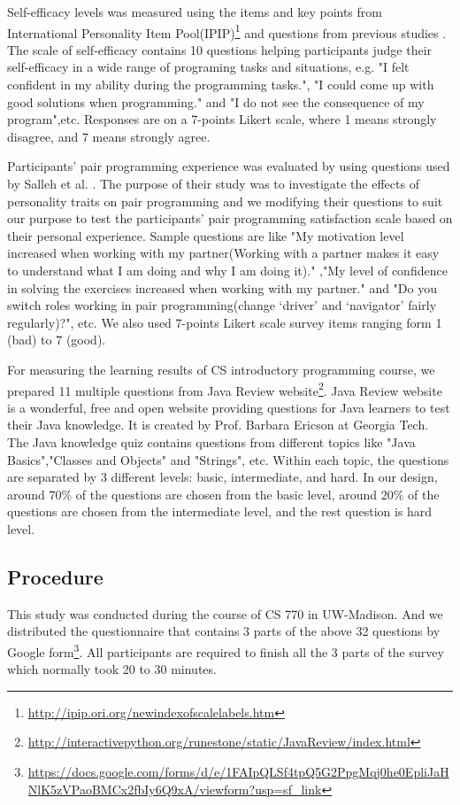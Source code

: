 \documentclass{sigchi}
\begin{document}
Self-efficacy levels was measured using the items and key points from International Personality Item Pool(IPIP)\footnote{\url{http://ipip.ori.org/newindexofscalelabels.htm}} and questions from
previous studies \cite{ramalingam1998development,wilson2001contributing}. The scale of self-efficacy contains 10 questions helping participants judge their self-efficacy in a wide range of programing tasks and situations, e.g. "I felt confident in my ability during the programming tasks.", "I could come up with good solutions when programming." and "I do not see the consequence of my program",etc. Responses are on a 7-points Likert scale, where 1 means strongly disagree, and 7 means strongly agree.

Participants' pair programming experience was evaluated by using questions used by Salleh et al. \cite{salleh2014investigating}. The purpose of their study was to investigate the effects of personality traits on pair programming and we modifying their questions to suit our purpose to test the participants' pair programming satisfaction scale based on their personal experience. Sample questions are like "My motivation level increased when working with my partner(Working with a partner makes it easy to understand what I am doing and why I am doing it)." ,"My level of confidence in solving the exercises increased when working with my partner." and "Do you switch roles working in pair programming(change ‘driver’ and ‘navigator’ fairly regularly)?", etc. We also used 7-points Likert scale survey items ranging form 1 (bad) to 7 (good).

For measuring the learning results of CS introductory programming course, we prepared 11 multiple questions from Java Review website\footnote{\url{http://interactivepython.org/runestone/static/JavaReview/index.html}}. Java Review website is a wonderful, free and open website providing questions for Java learners to test their Java knowledge. It is created by Prof. Barbara Ericson at Georgia Tech.  The Java knowledge quiz contains questions from different topics like "Java Basics","Classes and Objects" and "Strings", etc. Within each topic, the questions are separated by 3 different levels: basic, intermediate, and hard. In our design, around 70\% of the questions are chosen from the basic level, around 20\% of the questions are chosen from the intermediate level, and the rest question is hard level. 


\subsection{Procedure}
This study was conducted during the course of CS 770 in UW-Madison. And we distributed the questionnaire that contains 3 parts of the above 32 questions by Google form\footnote{\url{https://docs.google.com/forms/d/e/1FAIpQLSf4tpQ5G2PpgMqj0he0EpliJaHNlK5zVPaoBMCx2fbIy6Q9xA/viewform?usp=sf_link}}. All participants are required to finish all the 3 parts of the survey which normally took 20 to 30 minutes.
\end{document}
